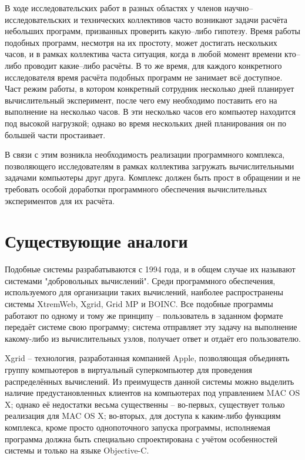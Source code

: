 \documentclass[a4paper,12pt]{report}
\numberwithin{equation}{section}
\begin{document}
В ходе исследовательских работ в разных областях у членов научно--исследовательских и технических коллективов часто возникают задачи расчёта небольших программ, призванных проверить какую--либо гипотезу. 
Время работы подобных программ, несмотря на их простоту, может достигать нескольких часов, и в рамках коллектива часта ситуация, когда в любой момент времени кто--либо проводит какие--либо расчёты. 
В то же время, для каждого конкретного исследователя время расчёта подобных программ не занимает всё доступное. 
Част режим работы, в котором конкретный сотрудник несколько дней планирует вычислительный эксперимент, после чего ему необходимо поставить его на выполнение на несколько часов. 
В эти несколько часов его компьютер находится под высокой нагрузкой; однако во время нескольких дней планирования он по большей части простаивает.

В связи с этим возникла необходимость реализации программного комплекса, позволяющего исследователям в рамках коллектива загружать вычислительными задачами компьютеры друг друга.
Комплекс должен быть прост в обращении и не требовать особой доработки программного обеспечения вычислительных экспериментов для их расчёта.

\clearpage
\section{Существующие аналоги}

Подобные системы разрабатываются с 1994 года, и в общем случае их называют системами "добровольных вычислений".
Среди программного обеспечения, используемого для организации таких вычислений, наиболее распространены системы XtremWeb, Xgrid, Grid MP и BOINC.
Все подобные программы работают по одному и тому же принципу -- пользователь в заданном формате передаёт системе свою программу; система отправляет эту задачу на выполнение какому-либо из вычислительных узлов, получает ответ и отдаёт его пользователю.

Xgrid -- технология, разработанная компанией Apple, позволяющая объединять группу компьютеров в виртуальный суперкомпьютер для проведения распределённых вычислений. 
Из преимуществ данной системы можно выделить наличие предустановленных клиентов на компьютерах под управлением MAC OS X; однако её недостатки весьма существенны -- во-первых, существует только реализация для MAC OS X; во-вторых, для доступа к каким-либо функциям комплекса, кроме просто однопоточного запуска программы, исполняемая программа должна быть специально спроектирована с учётом особенностей системы и только на языке Objective-C.
\end{document}
